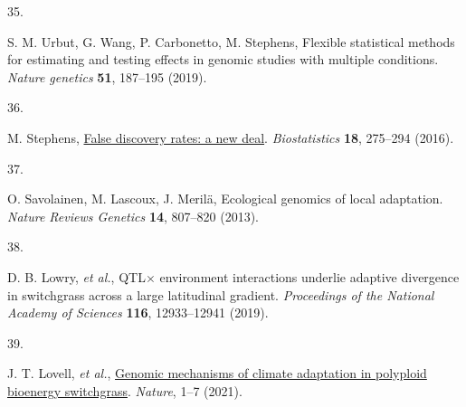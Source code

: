 \documentclass[
  9pt,
  twocolumn,
  twoside]{pnas-new}
\newlength{\cslhangindent}
\newlength{\csllabelwidth}
\newenvironment{CSLReferences}[2] %
 {\begin{list}{}{%
  \setlength{\itemindent}{0pt}
  \setlength{\leftmargin}{0pt}
  \setlength{\parsep}{0pt}
  \ifodd #1
   \setlength{\leftmargin}{\cslhangindent}
   \setlength{\itemindent}{-1\cslhangindent}
  \fi
  \setlength{\itemsep}{#2\baselineskip}}}
 {\end{list}}
\newcommand{\CSLLeftMargin}[1]{\parbox[t]{\csllabelwidth}{\strut#1\strut}}
\newcommand{\CSLRightInline}[1]{\parbox[t]{\linewidth - \csllabelwidth}{\strut#1\strut}}
\begin{document}
\begin{CSLReferences}{0}{1}
\CSLLeftMargin{35. }%
\CSLRightInline{S. M. Urbut, G. Wang, P. Carbonetto, M. Stephens,
Flexible statistical methods for estimating and testing effects in
genomic studies with multiple conditions. \emph{Nature genetics}
\textbf{51}, 187--195 (2019).}

\CSLLeftMargin{36. }%
\CSLRightInline{M. Stephens,
\href{https://doi.org/10.1093/biostatistics/kxw041}{{False discovery
rates: a new deal}}. \emph{Biostatistics} \textbf{18}, 275--294 (2016).}

\CSLLeftMargin{37. }%
\CSLRightInline{O. Savolainen, M. Lascoux, J. Merilä, Ecological
genomics of local adaptation. \emph{Nature Reviews Genetics}
\textbf{14}, 807--820 (2013).}

\CSLLeftMargin{38. }%
\CSLRightInline{D. B. Lowry, \emph{et al.}, QTL\(\times\) environment
interactions underlie adaptive divergence in switchgrass across a large
latitudinal gradient. \emph{Proceedings of the National Academy of
Sciences} \textbf{116}, 12933--12941 (2019).}

\CSLLeftMargin{39. }%
\CSLRightInline{J. T. Lovell, \emph{et al.},
\href{https://doi.org/10.1038/s41586-020-03127-1}{Genomic mechanisms of
climate adaptation in polyploid bioenergy switchgrass}. \emph{Nature},
1--7 (2021).}

\end{CSLReferences}


\showacknow{} %
\end{document}
